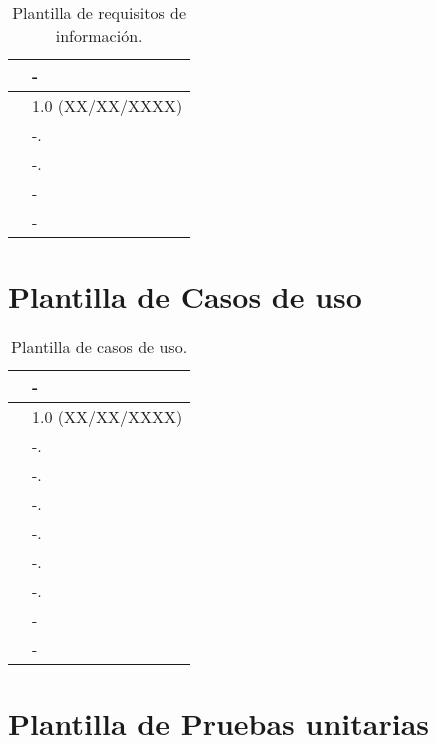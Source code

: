 \begin{table}[H]
\begin{center}
\begin{tabular}{|p{3cm}|p{10cm}|} \hline
\centering {\bf IRQ-XX} & -  \\ \hline\hline
\centering {\bf Versión} & 1.0 (XX/XX/XXXX) \\ \hline
\centering {\bf Descripción} &  -. \\ \hline
\centering {\bf Datos específicos} &  -. \\ \hline
\centering {\bf Importancia} & - \\ \hline
\centering {\bf Urgencia} & - \\ \hline
\end{tabular}
\caption{Plantilla de requisitos de información.}
\label{enlaceIRQX}
\end{center}
\end{table}


\section{Plantilla de Casos de uso}

\begin{table}[H]
\begin{center}
\begin{tabular}{|p{3cm}|p{10cm}|} \hline
\centering {\bf UC-XX} & -  \\ \hline\hline
\centering {\bf Versión} & 1.0 (XX/XX/XXXX) \\ \hline
\centering {\bf Dependencias} &  -. \\ \hline
\centering {\bf Descripción} &  -. \\ \hline
\centering {\bf Precondición} &  -. \\ \hline
\centering {\bf Secuencia normal} &  -. \\ \hline
\centering {\bf Postcondición} &  -. \\ \hline
\centering {\bf Excepciones} &  -. \\ \hline
\centering {\bf Importancia} & - \\ \hline
\centering {\bf Urgencia} & - \\ \hline
\end{tabular}
\caption{Plantilla de casos de uso.}
\label{enlaceUCX}
\end{center}
\end{table}


\section{Plantilla de Pruebas unitarias}

